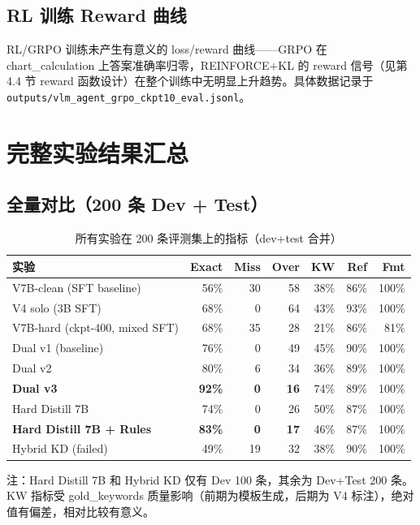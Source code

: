 \documentclass[12pt,a4paper]{ctexart}
\begin{document}
\subsection{RL 训练 Reward 曲线}

RL/GRPO 训练未产生有意义的 loss/reward 曲线——GRPO 在 chart\_calculation 上答案准确率归零，REINFORCE+KL 的 reward 信号（见第 4.4 节 reward 函数设计）在整个训练中无明显上升趋势。具体数据记录于 \texttt{outputs/vlm\_agent\_grpo\_ckpt10\_eval.jsonl}。

\section{完整实验结果汇总}

\subsection{全量对比（200 条 Dev + Test）}

\begin{table}[H]
\centering
\small
\caption{所有实验在 200 条评测集上的指标（dev+test 合并）}
\begin{tabular}{lrrrrrr}
\toprule
实验 & Exact & Miss & Over & KW & Ref & Fmt \\
\midrule
V7B-clean (SFT baseline) & 56\% & 30 & 58 & 38\% & 86\% & 100\% \\
V4 solo (3B SFT) & 68\% & 0 & 64 & 43\% & 93\% & 100\% \\
V7B-hard (ckpt-400, mixed SFT) & 68\% & 35 & 28 & 21\% & 86\% & 81\% \\
Dual v1 (baseline) & 76\% & 0 & 49 & 45\% & 90\% & 100\% \\
Dual v2 & 80\% & 6 & 34 & 36\% & 89\% & 100\% \\
\textbf{Dual v3} & \textbf{92\%} & \textbf{0} & \textbf{16} & 74\% & 89\% & 100\% \\
\midrule
Hard Distill 7B & 74\% & 0 & 26 & 50\% & 87\% & 100\% \\
\textbf{Hard Distill 7B + Rules} & \textbf{83\%} & \textbf{0} & \textbf{17} & 46\% & 87\% & 100\% \\
Hybrid KD (failed) & 49\% & 19 & 32 & 38\% & 90\% & 100\% \\
\bottomrule
\end{tabular}
\end{table}

注：Hard Distill 7B 和 Hybrid KD 仅有 Dev 100 条，其余为 Dev+Test 200 条。KW 指标受 gold\_keywords 质量影响（前期为模板生成，后期为 V4 标注），绝对值有偏差，相对比较有意义。
\end{document}
